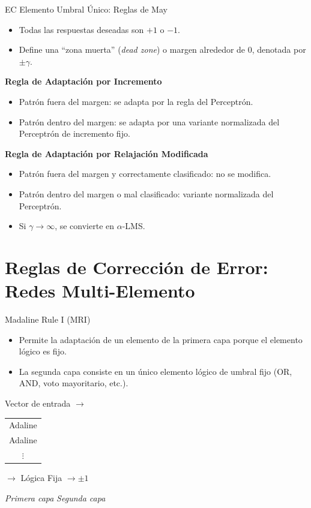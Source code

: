 \documentclass[aspectratio=169,utf8,spanish]{beamer}
\begin{document}
\begin{frame}{EC Elemento Umbral Único: Reglas de May}
  \begin{itemize}
    \item Todas las respuestas deseadas son $+1$ o $-1$.
    \item Define una ``zona muerta'' (\textit{dead zone}) o margen alrededor de $0$, denotada por $\pm\gamma$.
  \end{itemize}

  \textbf{Regla de Adaptación por Incremento}
  \begin{itemize}
    \item Patrón fuera del margen: se adapta por la regla del Perceptrón.
    \item Patrón dentro del margen: se adapta por una variante normalizada del Perceptrón de incremento fijo.
  \end{itemize}

  \textbf{Regla de Adaptación por Relajación Modificada}
  \begin{itemize}
    \item Patrón fuera del margen y correctamente clasificado: no se modifica.
    \item Patrón dentro del margen o mal clasificado: variante normalizada del Perceptrón.
    \item Si $\gamma \to \infty$, se convierte en $\alpha$-LMS.
  \end{itemize}
\end{frame}

\section{Reglas de Corrección de Error: Redes Multi-Elemento}

\begin{frame}{Madaline Rule I (MRI)}
  \begin{itemize}
    \item Permite la adaptación de un elemento de la primera capa porque el elemento lógico es fijo.
    \item La segunda capa consiste en un único elemento lógico de umbral fijo (OR, AND, voto mayoritario, etc.).
  \end{itemize}
  \begin{center}
    Vector de entrada $\to$
    \begin{tabular}{c}
      Adaline \\
      Adaline \\
      $\vdots$
    \end{tabular}
    $\to$ Lógica Fija $\to \pm 1$

    \small{\textit{Primera capa} \hspace{2cm} \textit{Segunda capa}}
  \end{center}
\end{frame}
\end{document}

